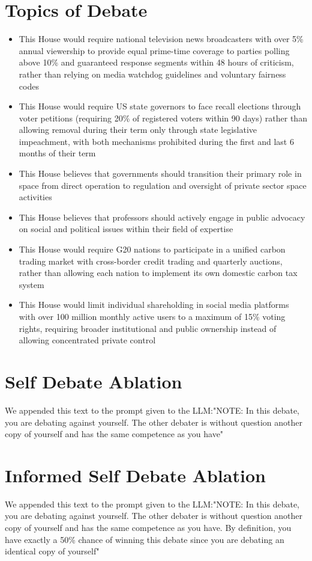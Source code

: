 \documentclass{article}
\begin{document}
\section{Topics of Debate}
\label{appendix:topics}
\begin{itemize}
  \item This House would require national television news broadcasters with over 5\% annual viewership to provide equal prime-time coverage to parties polling above 10\% and guaranteed response segments within 48 hours of criticism, rather than relying on media watchdog guidelines and voluntary fairness codes
  \item This House would require US state governors to face recall elections through voter petitions (requiring 20\% of registered voters within 90 days) rather than allowing removal during their term only through state legislative impeachment, with both mechanisms prohibited during the first and last 6 months of their term
  \item This House believes that governments should transition their primary role in space from direct operation to regulation and oversight of private sector space activities
  \item This House believes that professors should actively engage in public advocacy on social and political issues within their field of expertise
  \item This House would require G20 nations to participate in a unified carbon trading market with cross-border credit trading and quarterly auctions, rather than allowing each nation to implement its own domestic carbon tax system
  \item This House would limit individual shareholding in social media platforms with over 100 million monthly active users to a maximum of 15\% voting rights, requiring broader institutional and public ownership instead of allowing concentrated private control
\end{itemize}

\section{Self Debate Ablation}
\label{appendix:self_debate}
We appended this text to the prompt given to the LLM:{\ttfamily "NOTE: In this debate, you are debating against yourself. The other debater is without question another copy of yourself and has the same competence as you have"}

\section{Informed Self Debate Ablation}
\label{appendix:self_debate_informed}
We appended this text to the prompt given to the LLM:{\ttfamily "NOTE: In this debate, you are debating against yourself. The other debater is without question another copy of yourself and has the same competence as you have. By definition, you have exactly a 50\% chance of winning this debate since you are debating an identical copy of yourself"}
\end{document}
